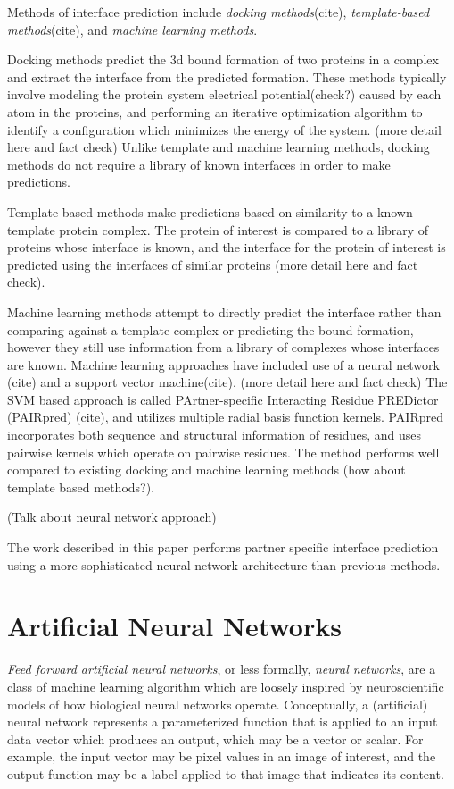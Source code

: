 Methods of interface prediction include \textit{docking methods}(cite), \textit{template-based methods}(cite), and \textit{machine learning methods}.

Docking methods predict the 3d bound formation of two proteins in a complex and extract the interface from the predicted formation. 
These methods typically involve modeling the protein system electrical potential(check?) caused by each atom in the proteins, and performing an iterative optimization algorithm to identify a configuration which minimizes the energy of the system. (more detail here and fact check)
Unlike template and machine learning methods, docking methods do not require a library of known interfaces in order to make predictions.

Template based methods make predictions based on similarity to a known template protein complex. 
The protein of interest is compared to a library of proteins whose interface is known, and the interface for the protein of interest is predicted using the interfaces of similar proteins (more detail here and fact check).

Machine learning methods attempt to directly predict the interface rather than comparing against a template complex or predicting the bound formation, however they still use information from a library of complexes whose interfaces are known.
Machine learning approaches have included use of a neural network (cite) and a support vector machine(cite). (more detail here and fact check)
The SVM based approach is called PArtner-specific Interacting Residue PREDictor (PAIRpred) (cite), and utilizes multiple radial basis function kernels. 
PAIRpred incorporates both sequence and structural information of residues, and uses pairwise kernels which operate on pairwise residues.
The method performs well compared to existing docking and machine learning methods (how about template based methods?).

(Talk about neural network approach)


The work described in this paper performs partner specific interface prediction using a more sophisticated neural network architecture than previous methods. 


\section{Artificial Neural Networks}

\textit{Feed forward artificial neural networks}, or less formally, \textit{neural networks}, are a class of machine learning algorithm which are loosely inspired by neuroscientific models of how biological neural networks operate. 
Conceptually, a (artificial) neural network represents a parameterized function that is applied to an input data vector which produces an output, which may be a vector or scalar. 
For example, the input vector may be pixel values in an image of interest, and the output function may be a label applied to that image that indicates its content.

